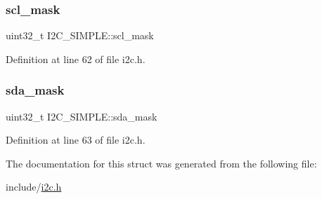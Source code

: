 \subsubsection{\texorpdfstring{scl\_mask}{scl\_mask}}
{\footnotesize\ttfamily uint32\+\_\+t I2\+C\+\_\+\+S\+I\+M\+P\+L\+E\+::scl\+\_\+mask}



Definition at line 62 of file i2c.\+h.

\mbox{\label{structI2C__SIMPLE_a4c7d6dd9f8bd42062ff62754331b0cdf}} 
\subsubsection{\texorpdfstring{sda\_mask}{sda\_mask}}
{\footnotesize\ttfamily uint32\+\_\+t I2\+C\+\_\+\+S\+I\+M\+P\+L\+E\+::sda\+\_\+mask}



Definition at line 63 of file i2c.\+h.



The documentation for this struct was generated from the following file\+:\begin{DoxyCompactItemize}
\item 
include/\mbox{\hyperlink{i2c_8h}{i2c.\+h}}\end{DoxyCompactItemize}
